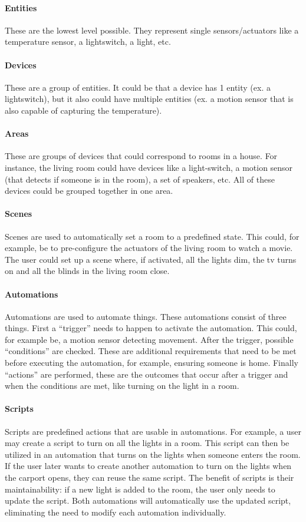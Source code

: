 \documentclass[11pt,a4paper]{report}
\begin{document}
\paragraph{Entities}
These are the lowest level possible. They represent single sensors/actuators like a temperature sensor, a lightswitch, a light, etc.
\paragraph{Devices}
These are a group of entities. It could be that a device has 1 entity (ex. a lightswitch), but it also could have multiple entities (ex. a motion sensor that is also capable of capturing the temperature).
\paragraph{Areas}
These are groups of devices that could correspond to rooms in a house. For instance, the living room could have devices like a light-switch, a motion sensor (that detects if someone is in the room), a set of speakers, etc. All of these devices could be grouped together in one area.
\paragraph{Scenes}
Scenes are used to automatically set a room to a predefined state. This could, for example, be to pre-configure the actuators of the living room to watch a movie. The user could set up a scene where, if activated, all the lights dim, the tv turns on and all the blinds in the living room close. 
\paragraph{Automations}
Automations are used to automate things. These automations consist of three things.
First a ``trigger'' needs to happen to activate the automation. This could, for example be, a motion sensor detecting movement. After the trigger, possible ``conditions'' are checked. These are additional requirements that need to be met before executing the automation, for example, ensuring someone is home. Finally ``actions'' are performed, these are the outcomes that occur after a trigger and when the conditions are met, like turning on the light in a room.
\paragraph{Scripts}
Scripts are predefined actions that are usable in automations. For example, a user may create a script to turn on all the lights in a room. This script can then be utilized in an automation that turns on the lights when someone enters the room. If the user later wants to create another automation to turn on the lights when the carport opens, they can reuse the same script. The benefit of scripts is their maintainability: if a new light is added to the room, the user only needs to update the script. Both automations will automatically use the updated script, eliminating the need to modify each automation individually.
\end{document}

